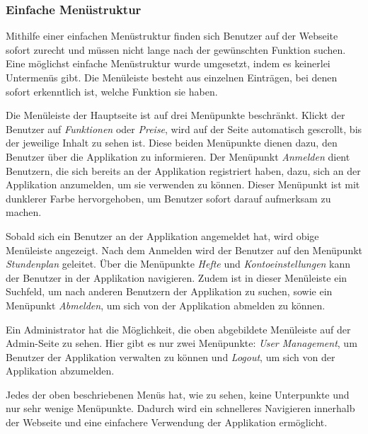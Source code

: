 \subsubsection{Einfache Menüstruktur}
Mithilfe einer einfachen Menüstruktur finden sich Benutzer auf der Webseite sofort zurecht und müssen nicht lange nach der gewünschten Funktion suchen. Eine möglichst einfache Menüstruktur wurde umgesetzt, indem es keinerlei Untermenüs gibt. Die Menüleiste besteht aus einzelnen Einträgen, bei denen sofort erkenntlich ist, welche Funktion sie haben.\\


Die Menüleiste der Hauptseite ist auf drei Menüpunkte beschränkt. Klickt der Benutzer auf \textit{Funktionen} oder \textit{Preise}, wird auf der Seite automatisch gescrollt, bis der jeweilige Inhalt zu sehen ist. Diese beiden Menüpunkte dienen dazu, den Benutzer über die Applikation zu informieren. Der Menüpunkt \textit{Anmelden} dient Benutzern, die sich bereits an der Applikation registriert haben, dazu, sich an der Applikation anzumelden, um sie verwenden zu können. Dieser Menüpunkt ist mit dunklerer Farbe hervorgehoben, um Benutzer sofort darauf aufmerksam zu machen.

\newpage


Sobald sich ein Benutzer an der Applikation angemeldet hat, wird obige Menüleiste angezeigt. Nach dem Anmelden wird der Benutzer auf den Menüpunkt \textit{Stundenplan} geleitet. Über die Menüpunkte \textit{Hefte} und \textit{Kontoeinstellungen} kann der Benutzer in der Applikation navigieren. Zudem ist in dieser Menüleiste ein Suchfeld, um nach anderen Benutzern der Applikation zu suchen, sowie ein Menüpunkt \textit{Abmelden}, um sich von der Applikation abmelden zu können.


Ein Administrator hat die Möglichkeit, die oben abgebildete Menüleiste auf der Admin-Seite zu sehen. Hier gibt es nur zwei Menüpunkte: \textit{User Management}, um Benutzer der Applikation verwalten zu können und \textit{Logout}, um sich von der Applikation abzumelden.

Jedes der oben beschriebenen Menüs hat, wie zu sehen, keine Unterpunkte und nur sehr wenige Menüpunkte. Dadurch wird ein schnelleres Navigieren innerhalb der Webseite und eine einfachere Verwendung der Applikation ermöglicht.

